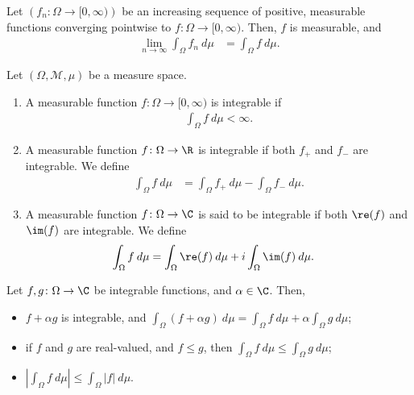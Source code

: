 \begin{theorem}
  Let $\left(f_n:\Omega\rightarrow [0,\infty)\right)$ be an increasing sequence of positive, measurable functions converging pointwise to $f\colon \Omega\rightarrow [0,\infty)$. Then, $f$ is measurable, and
  \begin{align*}
    \lim_{n\rightarrow\infty}\int_{\Omega}^{} f_n\:d\mu &= \int_{\Omega}^{} f\:d\mu.
  \end{align*}
\end{theorem}
\begin{definition}
  Let $\left(\Omega,\mathcal{M},\mu\right)$ be a measure space.
  \begin{enumerate}[(1)]
    \item A measurable function $f\colon \Omega\rightarrow [0,\infty)$ is integrable if
      \begin{align*}
        \int_{\Omega}^{} f\:d\mu < \infty.
      \end{align*}
    \item A measurable function $f\colon \Omega\rightarrow \R$ is integrable if both $f_{+}$ and $f_{-}$ are integrable. We define
      \begin{align*}
        \int_{\Omega}^{} f\:d\mu &= \int_{\Omega}^{} f_{+}\:d\mu - \int_{\Omega}^{} f_{-}\:d\mu.
      \end{align*}
    \item A measurable function $f\colon \Omega\rightarrow \C$ is said to be integrable if both $\re(f)$ and $\im(f)$ are integrable. We define
      \begin{align*}
        \int_{\Omega}^{} f\:d\mu &= \int_{\Omega}^{} \re(f)\:d\mu + i\int_{\Omega}^{} \im(f)\:d\mu.
      \end{align*}
  \end{enumerate}
\end{definition}
\begin{fact}
  Let $f,g\colon \Omega\rightarrow \C$ be integrable functions, and $\alpha\in\C$. Then,
  \begin{itemize}
    \item $f + \alpha g$ is integrable, and $\displaystyle \int_{\Omega}^{} \left(f + \alpha g\right)\:d\mu = \int_{\Omega}f\:d\mu + \alpha\int_{\Omega}g\:d\mu$;
    \item if $f$ and $g$ are real-valued, and $f\leq g$, then $\displaystyle \int_{\Omega}^{} f\:d\mu \leq \int_{\Omega}^{} g\:d\mu$;
    \item $\displaystyle \left\vert \int_{\Omega}^{} f\:d\mu \right\vert\leq \int_{\Omega}^{} \left\vert f \right\vert\:d\mu$.
  \end{itemize}
\end{fact}
